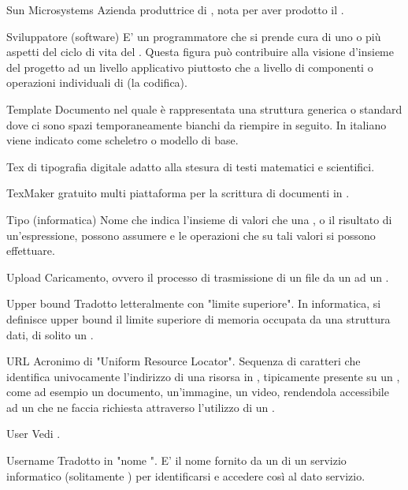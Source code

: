 \elemento
{Sun Microsystems}
{Azienda produttrice di , nota per aver prodotto il  .}

\elemento
{Sviluppatore (software)}
{E' un programmatore che si prende cura di uno o più aspetti del ciclo di vita del . Questa figura può contribuire alla visione d'insieme del progetto ad un livello applicativo piuttosto che a livello di componenti o operazioni individuali di  (la codifica).}


\elemento
{Template}
{Documento nel quale è rappresentata una struttura generica o standard dove ci sono spazi temporaneamente bianchi da riempire in seguito. In italiano viene indicato come scheletro o modello di base.}

\elemento
{Tex}
{ di tipografia digitale adatto alla stesura di testi matematici e scientifici.}

\elemento
{TexMaker}
{ gratuito multi piattaforma per la scrittura di documenti in .}

\elemento
{Tipo (informatica)}
{Nome che indica l'insieme di valori che una , o il risultato di un'espressione, possono assumere e le operazioni che su tali valori si possono effettuare.}


\elemento
{Upload}
{Caricamento, ovvero il processo di trasmissione di un file da un  ad un .}

\elemento
{Upper bound}
{Tradotto letteralmente con "limite superiore". In informatica, si definisce upper bound il limite superiore di memoria occupata da una struttura dati, di solito un .}

\elemento
{URL}
{Acronimo di "Uniform Resource Locator". Sequenza di caratteri che identifica univocamente l'indirizzo di una risorsa in , tipicamente presente su un  , come ad esempio un documento, un'immagine, un video, rendendola accessibile ad un  che ne faccia richiesta attraverso l'utilizzo di un  .}

\elemento
{User}
{Vedi .}

\elemento
{Username}
{Tradotto in "nome ". E' il nome fornito da un  di un servizio informatico (solitamente ) per identificarsi e accedere così al dato servizio.}

